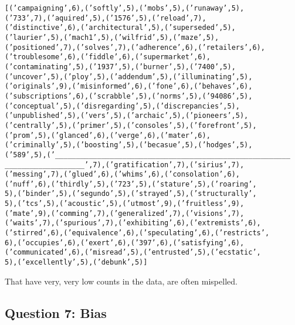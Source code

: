 \documentclass[letterpaper,10pt,english]{/usr/local/lib/python3.4/dist-packages/sphinx/texinputs/sphinxhowto}
\newenvironment{InvisibleVerbatim}
        {\begin{mdframed}[leftmargin=0.1\linewidth,innerleftmargin=3pt,innerrightmargin=3pt, userdefinedwidth=1\linewidth, linewidth=0pt, linecolor=white, usetwoside=false]}
        {\end{mdframed}}
\begin{document}
                \begin{InvisibleVerbatim}
                \vspace{-0.5\baselineskip}
\begin{alltt}[('campaigning', 6), ('softly', 5), ('mobs', 5), ('runaway', 5),
('733', 7), ('aquired', 5), ('1576', 5), ('reload', 7),
('distinctive', 6), ('architectural', 5), ('superseded', 5),
('laurier', 5), ('mach1', 5), ('wilfrid', 5), ('maze', 5),
('positioned', 7), ('solves', 7), ('adherence', 6), ('retailers', 6),
('troublesome', 6), ('fiddle', 6), ('supermarket', 6),
('contaminating', 5), ('1937', 5), ('burner', 5), ('7400', 5),
('uncover', 5), ('ploy', 5), ('addendum', 5), ('illuminating', 5),
('originals', 9), ('misinformed', 6), ('fone', 6), ('behaves', 6),
('subscriptions', 6), ('scrabble', 5), ('norms', 5), ('94086', 5),
('conceptual', 5), ('disregarding', 5), ('discrepancies', 5),
('unpublished', 5), ('vers', 5), ('archaic', 5), ('pioneers', 5),
('centrally', 5), ('primer', 5), ('consoles', 5), ('forefront', 5),
('prom', 5), ('glanced', 6), ('verge', 6), ('mater', 6),
('criminally', 5), ('boosting', 5), ('becasue', 5), ('hodges', 5),
('589', 5), ('\_\_\_\_\_\_\_\_\_\_\_\_\_\_\_\_\_\_\_\_\_\_\_\_\_\_\_\_\_\_\_\_\_\_\_\_\_\_\_\_\_\_\_\_\_\_\_\_\_\_\_\_\_\_\_\_
\_\_\_\_\_\_\_\_\_\_\_\_\_\_\_\_\_\_\_', 7), ('gratification', 7), ('sirius', 7),
('messing', 7), ('glued', 6), ('whims', 6), ('consolation', 6),
('nuff', 6), ('thirdly', 5), ('723', 5), ('stature', 5), ('roaring',
5), ('binder', 5), ('segundo', 5), ('strayed', 5), ('structurally',
5), ('tcs', 5), ('acoustic', 5), ('utmost', 9), ('fruitless', 9),
('mate', 9), ('comming', 7), ('generalized', 7), ('visions', 7),
('waits', 7), ('spurious', 7), ('exhibiting', 6), ('extremists', 6),
('stirred', 6), ('equivalence', 6), ('speculating', 6), ('restricts',
6), ('occupies', 6), ('exert', 6), ('397', 6), ('satisfying', 6),
('communicated', 6), ('misread', 5), ('entrusted', 5), ('ecstatic',
5), ('excellently', 5), ('debunk', 5)]
\end{alltt}

            \end{InvisibleVerbatim}
            
        
    
That have very, very low counts in the data, are often mispelled.

\subsection{Question 7: Bias}\label{question-7-bias}
\end{document}
